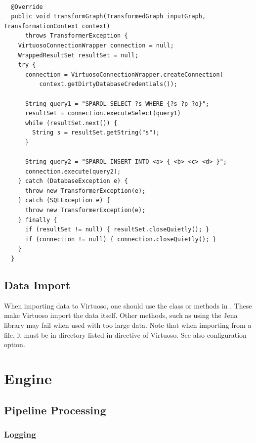 \begin{lstlisting}[caption={Example of programmatic access to Virtuoso database from a transformer},label=lst:virtuosoConnectionWrapper]

  @Override
  public void transformGraph(TransformedGraph inputGraph, TransformationContext context)
      throws TransformerException {
    VirtuosoConnectionWrapper connection = null;
    WrappedResultSet resultSet = null;
    try {
      connection = VirtuosoConnectionWrapper.createConnection(
          context.getDirtyDatabaseCredentials());

      String query1 = "SPARQL SELECT ?s WHERE {?s ?p ?o}";
      resultSet = connection.executeSelect(query1)
      while (resultSet.next()) {
        String s = resultSet.getString("s");
      }

      String query2 = "SPARQL INSERT INTO <a> { <b> <c> <d> }";
      connection.execute(query2);
    } catch (DatabaseException e) {
      throw new TransformerException(e);
    } catch (SQLException e) {
      throw new TransformerException(e);
    } finally {
      if (resultSet != null) { resultSet.closeQuietly(); }
      if (connection != null) { connection.closeQuietly(); }
    }
  }
\end{lstlisting}

\section{Data Import}
When importing data to Virtuoso, one should use the   class or methods in . These make Virtuoso import the data itself. Other methods, such as using the Jena library may fail when used with too large data. Note that when importing from a file, it must be in directory listed in  directive of Virtuoso. See also  configuration option.

\chapter{Engine}


\section{Pipeline Processing}
\subsection{Logging}

